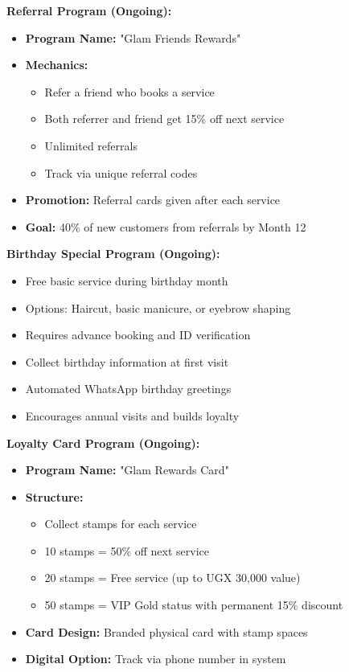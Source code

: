 \textbf{Referral Program (Ongoing):}
\begin{itemize}[leftmargin=2em]
    \item \textbf{Program Name:} "Glam Friends Rewards"
    \item \textbf{Mechanics:}
    \begin{itemize}
        \item Refer a friend who books a service
        \item Both referrer and friend get 15\% off next service
        \item Unlimited referrals
        \item Track via unique referral codes
    \end{itemize}
    \item \textbf{Promotion:} Referral cards given after each service
    \item \textbf{Goal:} 40\% of new customers from referrals by Month 12
\end{itemize}

\textbf{Birthday Special Program (Ongoing):}
\begin{itemize}[leftmargin=2em]
    \item Free basic service during birthday month
    \item Options: Haircut, basic manicure, or eyebrow shaping
    \item Requires advance booking and ID verification
    \item Collect birthday information at first visit
    \item Automated WhatsApp birthday greetings
    \item Encourages annual visits and builds loyalty
\end{itemize}

\textbf{Loyalty Card Program (Ongoing):}
\begin{itemize}[leftmargin=2em]
    \item \textbf{Program Name:} "Glam Rewards Card"
    \item \textbf{Structure:}
    \begin{itemize}
        \item Collect stamps for each service
        \item 10 stamps = 50\% off next service
        \item 20 stamps = Free service (up to UGX 30,000 value)
        \item 50 stamps = VIP Gold status with permanent 15\% discount
    \end{itemize}
    \item \textbf{Card Design:} Branded physical card with stamp spaces
    \item \textbf{Digital Option:} Track via phone number in system
\end{itemize}

